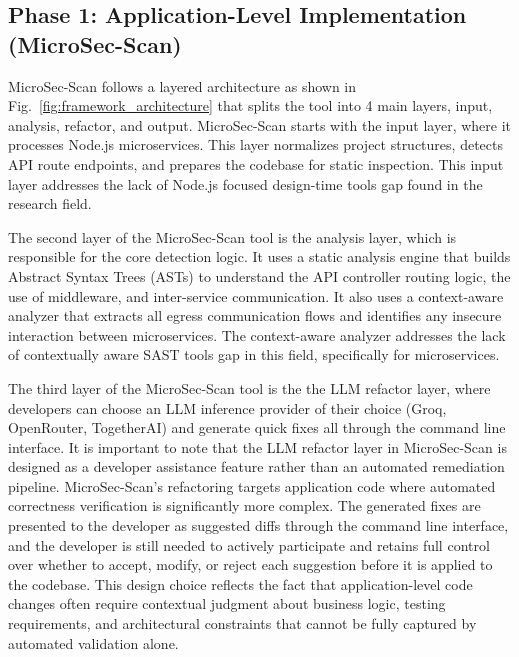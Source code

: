 \documentclass[preprint,12pt]{elsarticle}
\begin{document}
\subsection{Phase 1: Application-Level Implementation (MicroSec-Scan)}
MicroSec-Scan follows a layered architecture as shown in Fig.~\ref{fig:framework_architecture} that splits the tool into 4 main layers, input, analysis, refactor, and output. MicroSec-Scan starts with the input layer, where it processes Node.js microservices. This layer normalizes project structures, detects API route endpoints, and prepares the codebase for static inspection. This input layer addresses the lack of Node.js focused design-time tools gap found in the research field. 

The second layer of the MicroSec-Scan tool is the analysis layer, which is responsible for the core detection logic. It uses a static analysis engine that builds Abstract Syntax Trees (ASTs) to understand the API controller routing logic, the use of middleware, and inter-service communication. It also uses a context-aware analyzer that extracts all egress communication flows and identifies any insecure interaction between microservices. The context-aware analyzer addresses the lack of contextually aware SAST tools gap in this field, specifically for microservices. 

The third layer of the MicroSec-Scan tool is the the LLM refactor layer, where developers can choose an LLM inference provider of their choice (Groq, OpenRouter, TogetherAI) and generate quick fixes all through the command line interface. It is important to note that the LLM refactor layer in MicroSec-Scan is designed as a developer assistance feature rather than an automated remediation pipeline.
MicroSec-Scan's refactoring targets application code where automated correctness verification is significantly more complex. The generated fixes are presented to the developer as suggested diffs through the command line interface, and the developer is still needed to actively participate and retains full control over whether to accept, modify, or reject each suggestion before it is applied to the codebase. This design choice reflects the fact that application-level code changes often require contextual judgment about business logic, testing requirements, and architectural constraints that cannot be fully captured by automated validation alone. 
\end{document}
